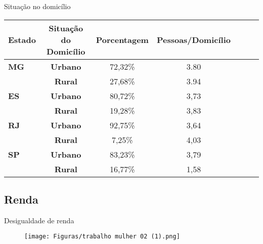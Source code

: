 \documentclass[xcolor={dvipsnames}]{beamer}
\begin{document}
\begin{frame}{Situação no domicílio}
    \begin{table}[h]
\begin{adjustbox}{width=\columnwidth,center}
\begin{tabular}{lcccccc}
\hline
\textbf{Estado} & \textbf{Situação do Domicílio} & \textbf{Porcentagem} & \textbf{Pessoas/Domicílio}\\ \hline
\textbf{MG} & \textbf{Urbano} & 72,32\% & 3.80 \\ 
\textbf{}   & \textbf{Rural}  & 27,68\% & 3.94 \\\hline
\textbf{ES} & \textbf{Urbano} & 80,72\% & 3,73 \\ 
\textbf{}   & \textbf{Rural}  & 19,28\% & 3,83 \\\hline
\textbf{RJ} & \textbf{Urbano} & 92,75\% & 3,64 \\
\textbf{}   & \textbf{Rural}  & 7,25\%  & 4,03 \\ \hline
\textbf{SP} & \textbf{Urbano} & 83,23\% & 3,79 \\
\textbf{}   & \textbf{Rural}  & 16,77\% & 1,58 \\\hline
\end{tabular}
\end{adjustbox}
\end{table}

\end{frame}

\subsection{Renda}
\begin{frame}{Desigualdade de renda}
\begin{figure}
\centering
  \texttt{[image: Figuras/trabalho mulher 02 (1).png]}
\end{figure}
\end{frame}
\end{document}
